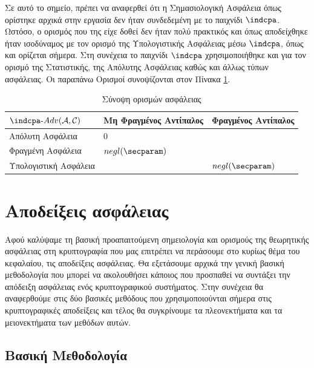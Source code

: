 Σε αυτό το σημείο, πρέπει να αναφερθεί ότι η Σημασιολογική Ασφάλεια όπως ορίστηκε αρχικά στην εργασία \cite{10.1145/800070.802212} δεν ήταν συνδεδεμένη με το παιχνίδι $\indcpa$. Ωστόσο, ο ορισμός που της είχε δοθεί δεν ήταν πολύ πρακτικός και όπως αποδείχθηκε ήταν ισοδύναμος με τον ορισμό της Υπολογιστικής Ασφάλειας μέσω $\indcpa$, όπως και ορίζεται σήμερα. Στη συνέχεια το παιχνίδι $\indcpa$ χρησιμοποιήθηκε και για τον ορισμό της Στατιστικής, της Απόλυτης Ασφάλειας καθώς και άλλως τύπων ασφάλειας.
Οι παραπάνω Ορισμοί συνοψίζονται στον Πίνακα \ref{security_notions_summary}.

\begin{table}[]
\begin{center}
\begin{tabular}{|l|l|l|}
\hline
$\indcpa\text{-}Adv(\mathcal{A}, \mathcal{C})$ & Μη Φραγμένος Αντίπαλος   & Φραγμένος Αντίπαλος      \\ \hline
Απόλυτη Ασφάλεια      & $0$                      & \cellcolor[HTML]{C0C0C0} \\ \hline
Φραγμένη Ασφάλεια     & $negl(\secparam)$          & \cellcolor[HTML]{C0C0C0} \\ \hline
Υπολογιστική Ασφάλεια & \cellcolor[HTML]{C0C0C0} & $negl(\secparam)$            \\ \hline
\end{tabular}
\caption{Σύνοψη ορισμών ασφάλειας}
\label{security_notions_summary}
\end{center}
\end{table}

\section{Αποδείξεις ασφάλειας}

Αφού καλύψαμε τη βασική προαπαιτούμενη σημειολογία και ορισμούς της θεωρητικής ασφάλειας στη κρυπτογραφία που μας επιτρέπει να περάσουμε στο κυρίως θέμα του κεφαλαίου, τις αποδείξεις ασφάλειας. Θα εξετάσουμε αρχικά την γενική βασική μεθοδολογία που μπορεί να ακολουθήσει κάποιος που προσπαθεί να συντάξει την απόδειξη ασφάλειας ενός κρυπτογραφικού συστήματος. Στην συνέχεια θα αναφερθούμε στις δύο βασικές μεθόδους που χρησιμοποιούνται σήμερα στις κρυπτογραφικές αποδείξεις και τέλος θα συγκρίνουμε τα πλεονεκτήματα και τα μειονεκτήματα των μεθόδων αυτών.

\subsection{Βασική Μεθοδολογία}

